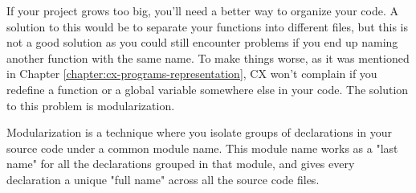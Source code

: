 \documentclass[11pt,fleqn,openany]{book} %
\begin{document}

If your project grows too big, you'll need a better way to organize your code. A solution to this would be to separate your functions into different files, but this is not a good solution as you could still encounter problems if you end up naming another function with the same name. To make things worse, as it was mentioned in Chapter \ref{chapter:cx-programs-representation}, CX won't complain if you redefine a function or a global variable somewhere else in your code. The solution to this problem is modularization.

Modularization is a technique where you isolate groups of declarations in your source code under a common module name. This module name works as a "last name" for all the declarations grouped in that module, and gives every declaration a unique "full name" across all the source code files.
\end{document}
